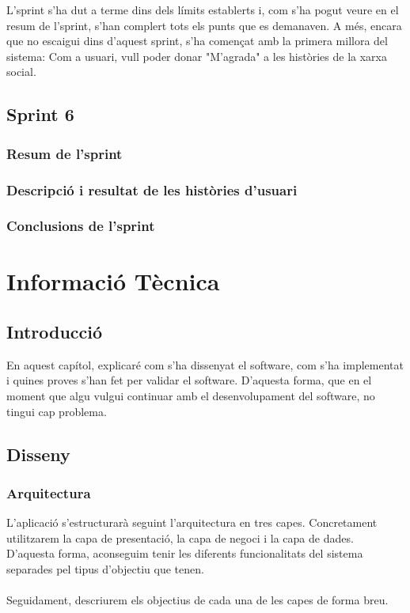 \documentclass[11pt,catalan,listoffigures,listoftables]{tfgetsinf}
\begin{document}
L'sprint s'ha dut a terme dins dels límits establerts i, com s'ha pogut veure en el resum de l'sprint, s'han complert tots els punts que es demanaven. A més, encara que no escaigui dins d'aquest sprint, s'ha començat amb la primera millora del sistema: Com a usuari, vull poder donar "M'agrada" a les històries de la xarxa social.

\section{Sprint 6}

\subsection{Resum de l'sprint}

\subsection{Descripció i resultat de les històries d’usuari}

\subsection{Conclusions de l'sprint}

\chapter{Informació Tècnica}

\section{Introducció}

En aquest capítol, explicaré com s'ha dissenyat el software, com s'ha implementat i quines proves s'han fet per validar el software. D'aquesta forma, que en el moment que algu vulgui continuar amb el desenvolupament del software, no tingui cap problema.

\section{Disseny}
\subsection{Arquitectura}
L'aplicació s'estructurarà seguint l'arquitectura en tres capes. Concretament utilitzarem la capa de presentació, la capa de negoci i la capa de dades. D'aquesta forma, aconseguim tenir les diferents funcionalitats del sistema separades pel tipus d'objectiu que tenen.\\ \\
Seguidament, descriurem els objectius de cada una de les capes de forma breu.
\end{document}
